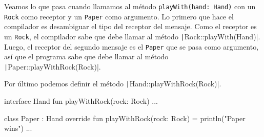   Veamos lo que pasa cuando llamamos al método \texttt{playWith(hand: Hand)} con un
  \texttt{Rock} como receptor y un \texttt{Paper} como argumento.
  Lo primero que hace el compilador es desambiguar el tipo del receptor del mensaje.
  Como el receptor es un \texttt{Rock}, el compilador sabe que debe llamar al método
  \texttt|Rock::playWith(Hand)|.
  Luego, el receptor del segundo mensaje es el \texttt{Paper} que se pasa como argumento, así que
  el programa sabe que debe llamar al método \texttt|Paper::playWithRock(Rock)|.

  Por último podemos definir el método \texttt|Hand::playWithRock(Rock)|.

  \begin{kotlin}
    interface Hand {
      fun playWithRock(rock: Rock)
      ...
    }
  \end{kotlin}

  \begin{kotlin}
    class Paper : Hand {
      override fun playWithRock(rock: Rock) = println("Paper wins")
      ...
    }
  \end{kotlin}